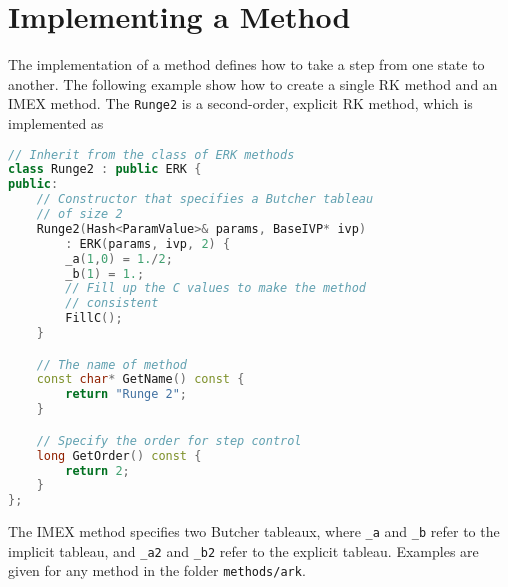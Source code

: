 \documentclass[11pt]{article}
\begin{document}
\section{Implementing a Method}

The implementation of a method defines how to take a step from one state to another. The following example show how to create a single RK method and an IMEX method. The \verb=Runge2= is a second-order, explicit RK method, which is implemented as
\begin{lstlisting}[tabsize=4,language=c++]
// Inherit from the class of ERK methods
class Runge2 : public ERK {
public:
	// Constructor that specifies a Butcher tableau
	// of size 2
	Runge2(Hash<ParamValue>& params, BaseIVP* ivp)
		: ERK(params, ivp, 2) {
		_a(1,0) = 1./2;
		_b(1) = 1.;
		// Fill up the C values to make the method
		// consistent
		FillC();
	}

	// The name of method
	const char* GetName() const {
		return "Runge 2";
	}

	// Specify the order for step control	
	long GetOrder() const {
		return 2;
	}
};
\end{lstlisting}

The IMEX method specifies two Butcher tableaux, where \verb=_a= and \verb=_b= refer to the implicit tableau, and \verb=_a2= and \verb=_b2= refer to the explicit tableau. Examples are given for any method in the folder \verb=methods/ark=.



\end{document}

